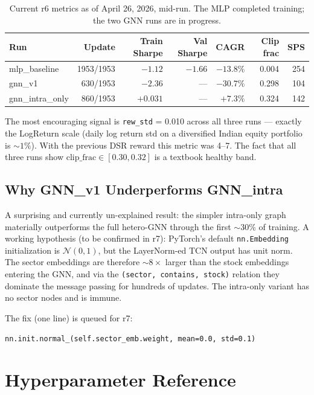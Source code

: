 \documentclass[11pt,a4paper]{article}
\begin{document}
\begin{table}[h]
\centering
\caption{Current r6 metrics as of April 26, 2026, mid-run. The MLP completed
training; the two GNN runs are in progress.}
\small
\begin{tabularx}{\textwidth}{l r r r r r r}
\toprule
\textbf{Run} & \textbf{Update} & \textbf{Train Sharpe} & \textbf{Val Sharpe} & \textbf{CAGR} & \textbf{Clip frac} & \textbf{SPS} \\
\midrule
mlp\_baseline & 1953/1953 & $-1.12$ & $-1.66$ & $-13.8\%$ & 0.004 & 254 \\
gnn\_v1 & 630/1953 & $-2.36$ & --- & $-30.7\%$ & 0.298 & 104 \\
gnn\_intra\_only & 860/1953 & $\mathbf{+0.031}$ & --- & $\mathbf{+7.3\%}$ & 0.324 & 142 \\
\bottomrule
\end{tabularx}
\end{table}

The most encouraging signal is \texttt{rew\_std} = 0.010 across all three runs ---
exactly the LogReturn scale (daily log return std on a diversified Indian equity
portfolio is $\sim 1\%$). With the previous DSR reward this metric was 4--7. The
fact that all three runs show $\text{clip\_frac} \in [0.30, 0.32]$ is a textbook
healthy band.

\subsection{Why GNN\_v1 Underperforms GNN\_intra}

A surprising and currently un-explained result: the simpler intra-only graph
materially outperforms the full hetero-GNN through the first $\sim$30\% of training.
A working hypothesis (to be confirmed in r7): PyTorch's default
\texttt{nn.Embedding} initialization is $\mathcal{N}(0, 1)$, but the LayerNorm-ed
TCN output has unit norm. The sector embeddings are therefore $\sim 8\times$ larger
than the stock embeddings entering the GNN, and via the
\texttt{(sector, contains, stock)} relation they dominate the message passing for
hundreds of updates. The intra-only variant has no sector nodes and is immune.

The fix (one line) is queued for r7:
\begin{lstlisting}
nn.init.normal_(self.sector_emb.weight, mean=0.0, std=0.1)
\end{lstlisting}

\section{Hyperparameter Reference}
\end{document}
